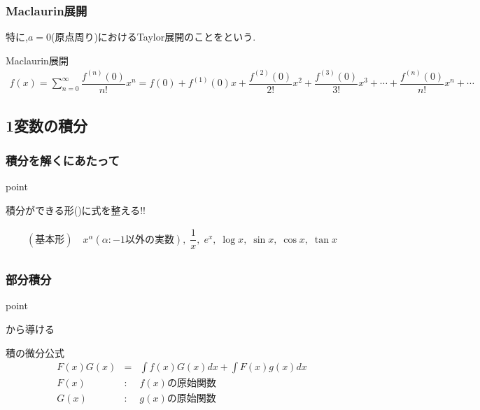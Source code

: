 \documentclass[a4paper]{jsarticle}
\begin{document}
\subsubsection{Maclaurin展開}
特に,$a=0$(原点周り)におけるTaylor展開のことをという.
\begin{itembox}[l]{Maclaurin展開}
    \begin{eqnarray*}
        f\left(x\right)=
        \displaystyle\sum_{n=0}^{\infty}{\dfrac{f^{\left(n\right)}\left(0\right)}{n!}}x^n=
        f\left(0\right)+f^{\left(1\right)}\left(0\right)x
        +\dfrac{f^{\left(2\right)}\left(0\right)}{2!}x^2
        +\dfrac{f^{\left(3\right)}\left(0\right)}{3!}x^3
        +\cdots
        +\dfrac{f^{\left(n\right)}\left(0\right)}{n!}x^n+\cdots
    \end{eqnarray*}
\end{itembox}
\subsection{1変数の積分}
\subsubsection{積分を解くにあたって}
\begin{itembox}[l]{point}
    \begin{center}
        積分ができる形()に式を整える!!\\
    \end{center}
    \begin{eqnarray*}
        (基本形)\quad x^\alpha\!(\alpha:-1以外の実数),\; \dfrac{1}{x},\; e^x,\; \log x,\; \sin x,\; \cos x,\; \tan x\\
    \end{eqnarray*}
\end{itembox}
\subsubsection{部分積分}
\begin{itembox}[l]{point}
    \begin{center}
        から導ける
    \end{center}
\end{itembox}
\begin{itembox}[l]{積の微分公式}
    \begin{eqnarray*}
        F\left(x\right)G\left(x\right)&=&\displaystyle\int f\left(x\right)G\left(x\right)dx+\int F\left(x\right)g\left(x\right)dx\\
        F\left(x\right)&:&f\left(x\right)の原始関数\\
        G\left(x\right)&:&g\left(x\right)の原始関数\\
    \end{eqnarray*}
\end{itembox}
\end{document}
